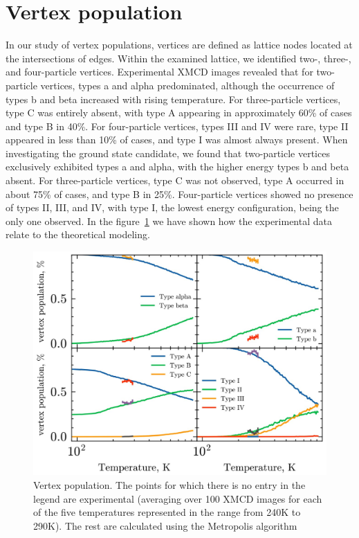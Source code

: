 \documentclass[pre,reprint,superscriptaddress]{revtex4-2}
\begin{document}
\section{Vertex population}

In our study of vertex populations, vertices are defined as lattice nodes located at the intersections of edges. Within the examined lattice, we identified two-, three-, and four-particle vertices. Experimental XMCD images revealed that for two-particle vertices, types a and alpha predominated, although the occurrence of types b and beta increased with rising temperature. For three-particle vertices, type C was entirely absent, with type A appearing in approximately 60\% of cases and type B in 40\%. For four-particle vertices, types III and IV were rare, type II appeared in less than 10\% of cases, and type I was almost always present. When investigating the ground state candidate, we found that two-particle vertices exclusively exhibited types a and alpha, with the higher energy types b and beta absent. For three-particle vertices, type C was not observed, type A occurred in about 75\% of cases, and type B in 25\%. Four-particle vertices showed no presence of types II, III, and IV, with type I, the lowest energy configuration, being the only one observed. In the figure~\ref{fig:fig_vertex} we have shown how the experimental data relate to the theoretical modeling.

\begin{figure}
        \includegraphics[width=\linewidth]{figs/vertex_population.jpg}         \caption{\label{fig:fig_vertex}Vertex population. The points for which there is no entry in the legend are experimental (averaging over 100 XMCD images for each of the five temperatures represented in the range from 240K to 290K). The rest are calculated using the Metropolis algorithm}
\end{figure}
\end{document}
